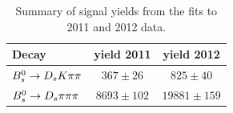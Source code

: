 \begin{table}[h]
\centering
\begin{tabular}{l c c}
Decay & yield 2011 & yield 2012\\
\hline
${{B}^0_{s}}\rightarrow{\ensuremath{{D}_{s}}}{\ensuremath{K}}{\ensuremath{\pi}}{\ensuremath{\pi}}$ &  $367 \pm  26$   &  $825 \pm 40$\\
${{B}^0_{s}}\rightarrow{\ensuremath{{D}_{s}}}{\ensuremath{\pi}}{\ensuremath{\pi}}{\ensuremath{\pi}}$ &  $8693 \pm 102$  &  $19881 \pm 159$\\
\hline
\end{tabular}
\caption{Summary of signal yields from the fits to 2011 and 2012 data.}
\label{tab: SigYields}
\end{table}

